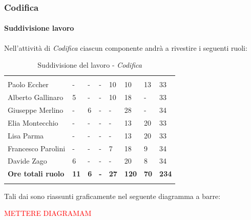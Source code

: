 		
		\subsubsection{Codifica}
			\paragraph{Suddivisione lavoro}
			Nell'attività di \textit{Codifica} ciascun componente andrà a rivestire i seguenti ruoli:
			\begin{table}[H]
				\centering
				\begin{tabular}{|C{4cm}|C{0.6cm}|C{0.6cm}|C{0.6cm}|C{0.6cm}|C{0.6cm}|C{0.6cm}|C{3cm}|}
					 & & &&&&&\\
					Paolo Eccher      & - & - & - & 10 & 10 & 13 & 33 \\
					Alberto Gallinaro & 5 & - & - & 10 & 18 & - & 33 \\
					Giuseppe Merlino  & - & 6 & - & - & 28 & - & 34 \\
					Elia Montecchio   & - & - & - & - & 13 & 20 & 33 \\
					Lisa Parma        & - & - & - & - & 13 & 20 & 33 \\
					Francesco Parolini& - & - & - & 7 & 18 & 9 & 34 \\
					Davide Zago       & 6 & - & - & - & 20 & 8 & 34 \\
					\textbf{Ore totali ruolo}  & \textbf{11} & \textbf{6} & \textbf{-} & \textbf{27} & \textbf{120} & \textbf{70} & \textbf{234} \\
				\end{tabular}
				\caption{Suddivisione del lavoro - \textit{Codifica}}
			\end{table}
			
			Tali dai sono riassunti graficamente nel seguente diagramma a barre:
			
			\textcolor{red}{METTERE DIAGRAMAM}
			
			
